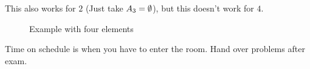 \begin{remark}
    This also works for $2$ (Just take $A_3 = \emptyset$), but this doesn't work for $4$.
\end{remark}
\begin{figure}[H]
    \centering
    \caption{Example with four elements}
    \label{fig:example-with-four-elements}
\end{figure}
\begin{remark}
    Time on schedule is when you have to enter the room.
    Hand over problems after exam.
\end{remark}
